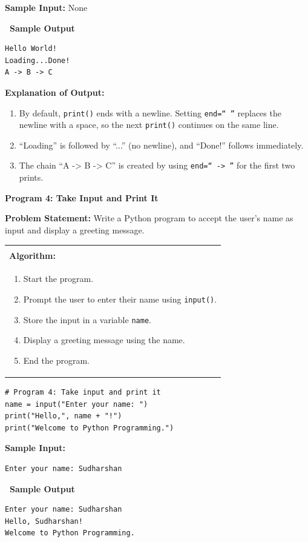 \documentclass[12pt,a4paper]{article}
\makeatletter
\newcommand{\outhead}{\noindent\colorbox{cmrgreen!25}%
  {\textbf{\small\color{cmrdark}~Sample Output~}}\par\vspace{-1pt}}
\newenvironment{algobox}{%
  \par\vspace{4pt}%
  \noindent\begin{tabular}{@{}p{\linewidth}@{}}%
  \hline\\[-8pt]%
  \textbf{\color{blue!60!black}\small Algorithm:}\\[2pt]%
}{%
  \\[-4pt]\hline%
  \end{tabular}\par\vspace{4pt}%
}
\makeatother
\begin{document}
\textbf{Sample Input:} None

\outhead
\begin{lstlisting}[style=outputstyle]
Hello World!
Loading...Done!
A -> B -> C
\end{lstlisting}

\textbf{Explanation of Output:}
\begin{enumerate}
  \item By default, \texttt{print()} ends with a newline. Setting \texttt{end=`` ''} replaces the newline with a space, so the next \texttt{print()} continues on the same line.
  \item ``Loading'' is followed by ``...'' (no newline), and ``Done!'' follows immediately.
  \item The chain ``A -> B -> C'' is created by using \texttt{end=`` -> ''} for the first two prints.
\end{enumerate}

\vspace{0.5cm}

\textbf{Program 4: Take Input and Print It}

\textbf{Problem Statement:}
Write a Python program to accept the user's name as input and display a greeting message.

\begin{algobox}
\begin{enumerate}[label=Step \arabic*:]
  \item Start the program.
  \item Prompt the user to enter their name using \texttt{input()}.
  \item Store the input in a variable \texttt{name}.
  \item Display a greeting message using the name.
  \item End the program.
\end{enumerate}
\end{algobox}

\begin{lstlisting}
# Program 4: Take input and print it
name = input("Enter your name: ")
print("Hello,", name + "!")
print("Welcome to Python Programming.")
\end{lstlisting}

\textbf{Sample Input:}
\begin{verbatim}
Enter your name: Sudharshan
\end{verbatim}

\outhead
\begin{lstlisting}[style=outputstyle]
Enter your name: Sudharshan
Hello, Sudharshan!
Welcome to Python Programming.
\end{lstlisting}
\end{document}
